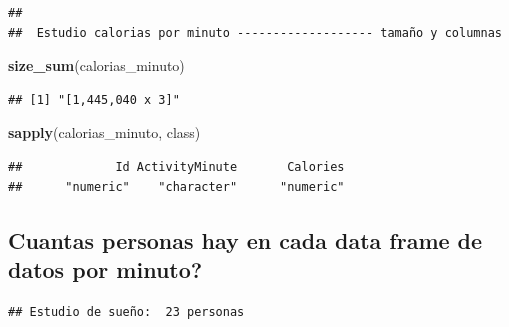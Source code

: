 \documentclass[
]{article}
\newenvironment{Shaded}{\begin{snugshade}}{\end{snugshade}}
\newcommand{\FunctionTok}[1]{\textcolor[rgb]{0.13,0.29,0.53}{\textbf{#1}}}
\newcommand{\NormalTok}[1]{#1}
\newcommand{\SpecialCharTok}[1]{\textcolor[rgb]{0.81,0.36,0.00}{\textbf{#1}}}
\newcommand{\StringTok}[1]{\textcolor[rgb]{0.31,0.60,0.02}{#1}}
\begin{document}
\begin{verbatim}
## 
##  Estudio calorias por minuto ------------------- tamaño y columnas
\end{verbatim}

\begin{Shaded}
\begin{Highlighting}[]
\FunctionTok{size\_sum}\NormalTok{(calorias\_minuto)}
\end{Highlighting}
\end{Shaded}

\begin{verbatim}
## [1] "[1,445,040 x 3]"
\end{verbatim}

\begin{Shaded}
\begin{Highlighting}[]
\FunctionTok{sapply}\NormalTok{(calorias\_minuto, class)}
\end{Highlighting}
\end{Shaded}

\begin{verbatim}
##             Id ActivityMinute       Calories 
##      "numeric"    "character"      "numeric"
\end{verbatim}

\subsection{Cuantas personas hay en cada data frame de datos por
minuto?}\label{cuantas-personas-hay-en-cada-data-frame-de-datos-por-minuto}

\begin{Shaded}
\end{Shaded}

\begin{verbatim}
## Estudio de sueño:  23 personas
\end{verbatim}

\begin{Shaded}
\end{Shaded}
\end{document}
